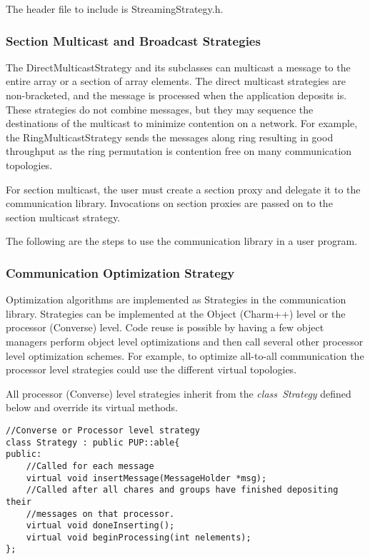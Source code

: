 {The header file to include is {\textrm{StreamingStrategy.h}}.

\subsubsection{Section Multicast and Broadcast Strategies}

The DirectMulticastStrategy and its subclasses can multicast a message to the entire
array or a section of array elements. The direct multicast strategies
are non-bracketed, and the message is processed when the application
deposits is. These strategies do not combine messages, but they may
sequence the destinations of the multicast to minimize contention on a
network. For example, the RingMulticastStrategy sends the messages
along ring resulting in good throughput as the ring permutation is
contention free on many communication topologies.

For section multicast, the user must create a section proxy and
delegate it to the communication library. Invocations on section
proxies are passed on to the section multicast strategy.

The following are the steps to use the communication library 
in a user program.







\subsubsection{Communication Optimization Strategy}

Optimization algorithms are implemented as Strategies in the
communication library. Strategies can be implemented at the Object
(Charm++) level or the processor (Converse) level. Code reuse is
possible by having a few object managers perform object level
optimizations and then call several other processor level optimization
schemes. For example, to optimize all-to-all communication the
processor level strategies could use the different virtual topologies.

All processor (Converse) level strategies inherit from the {\em
class~Strategy} defined below and override its virtual methods.

\begin{verbatim}
//Converse or Processor level strategy
class Strategy : public PUP::able{
public:
    //Called for each message
    virtual void insertMessage(MessageHolder *msg);
    //Called after all chares and groups have finished depositing their
    //messages on that processor.
    virtual void doneInserting();
    virtual void beginProcessing(int nelements);
};
\end{verbatim}

}
